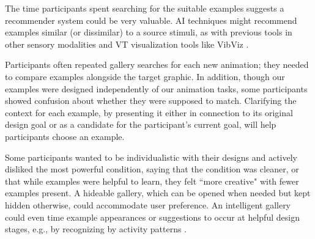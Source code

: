     
    The time participants spent searching for the suitable examples suggests a recommender system could be very valuable. %
    AI techniques might recommend examples similar (or dissimilar) to a source stimuli, as with previous tools in other sensory modalities \cite{Lee2010a} and VT 
    visualization tools like VibViz \cite{Seifi2015}.
    
    Participants often repeated gallery searches for each new animation; they needed to compare examples alongside the target graphic.
    In addition, though our examples were designed independently of our animation tasks, some participants showed confusion about whether they were supposed to match. %
    Clarifying the context for each example, by presenting it either in connection to its original design goal or as a candidate for the participant's current goal, will help participants choose an example.
    
    
    Some participants wanted to be individualistic with their designs and actively disliked the most powerful \hi condition, saying that the \none condition was cleaner, or that while examples were helpful to learn, they felt ``more creative" with fewer examples present.
    A hideable gallery, which can be opened when needed but kept hidden otherwise, could accommodate user preference.
    An intelligent gallery could even time example appearances or suggestions to occur at helpful design stages, e.g., by recognizing by activity patterns \cite{Warr2005,Dow2011}. %
    
    
%
%
    
